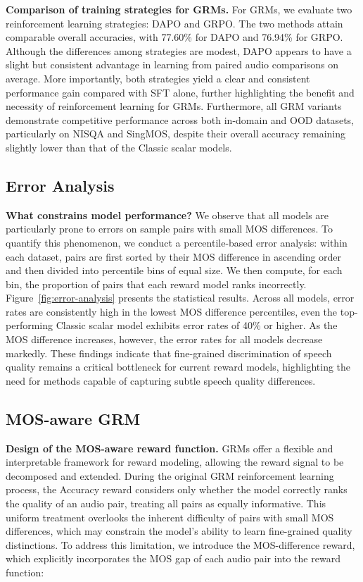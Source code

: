 \textbf{Comparison of training strategies for GRMs.}
For GRMs, we evaluate two reinforcement learning strategies: DAPO and GRPO. The two methods attain comparable overall accuracies, with 77.60\% for DAPO and 76.94\% for GRPO. Although the differences among strategies are modest, DAPO appears to have a slight but consistent advantage in learning from paired audio comparisons on average. More importantly, both strategies yield a clear and consistent performance gain compared with SFT alone, further highlighting the benefit and necessity of reinforcement learning for GRMs. Furthermore, all GRM variants demonstrate competitive performance across both in-domain and OOD datasets, particularly on NISQA and SingMOS, despite their overall accuracy remaining slightly lower than that of the Classic scalar models.
\subsection{Error Analysis}
\textbf{What constrains model performance?}
We observe that all models are particularly prone to errors on sample pairs with small MOS differences. To quantify this phenomenon, we conduct a percentile-based error analysis: within each dataset, pairs are first sorted by their MOS difference in ascending order and then divided into percentile bins of equal size. We then compute, for each bin, the proportion of pairs that each reward model ranks incorrectly. Figure~\ref{fig:error-analysis} presents the statistical results. Across all models, error rates are consistently high in the lowest MOS difference percentiles, even the top-performing Classic scalar model exhibits error rates of 40\% or higher. As the MOS difference increases, however, the error rates for all models decrease markedly. These findings indicate that fine-grained discrimination of speech quality remains a critical bottleneck for current reward models, highlighting the need for methods capable of capturing subtle speech quality differences.




\subsection{MOS-aware GRM}
\textbf{Design of the MOS-aware reward function.}
GRMs offer a flexible and interpretable framework for reward modeling, allowing the reward signal to be decomposed and extended. During the original GRM reinforcement learning process, the Accuracy reward considers only whether the model correctly ranks the quality of an audio pair, treating all pairs as equally informative. This uniform treatment overlooks the inherent difficulty of pairs with small MOS differences, which may constrain the model’s ability to learn fine-grained quality distinctions. To address this limitation, we introduce the MOS-difference reward, which explicitly incorporates the MOS gap of each audio pair into the reward function:

